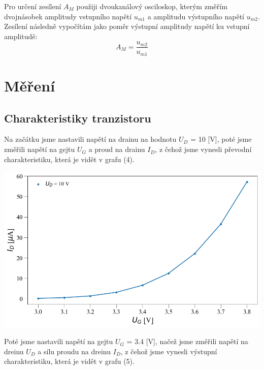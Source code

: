 \documentclass[a4paper,11pt]{article}
\begin{document}
    \begin{minipage}[t]{0.5\textwidth} 
                Pro určení zesílení $A_M$ použiji dvoukanálový osciloskop, kterým změřím dvojnásobek amplitudy vstupního napětí $u_{m1}$ a amplitudu výstupního napětí $u_{m2}$. Zesílení následně vypočítám jako poměr výstupní amplitudy napětí ku vstupní amplitudě:
                \begin{equation}
                    A_M = \frac{u_{m2}}{u_{m1}}
                \end{equation}
        \section{Měření}  
            \subsection{Charakteristiky tranzistoru}
                Na začátku jsme nastavili napětí na drainu na hodnotu $U_D$ = 10 [V], poté jsme změřili napětí na gejtu $U_G$ a proud na drainu $I_D$, z čehož jsme vynesli převodní charakteristiku, která je vidět v grafu (4). 
                \vspace{10pt}
                \par \centering
                \includegraphics[scale=0.35]{prev_out}
                \captionsetup{justification=centering, font=footnotesize}
                \label{fig:prev_out}
                \raggedright
                \vspace{10pt}
                Poté jsme nastavili napětí na gejtu $U_G$ = 3.4 [V], načež jsme změřili napětí na dreinu $U_D$ a sílu proudu na dreinu $I_D$, z čehož jsme vynesli výstupní charakteristiku, která je vidět v grafu (5). 

\end{minipage}
\end{document}
